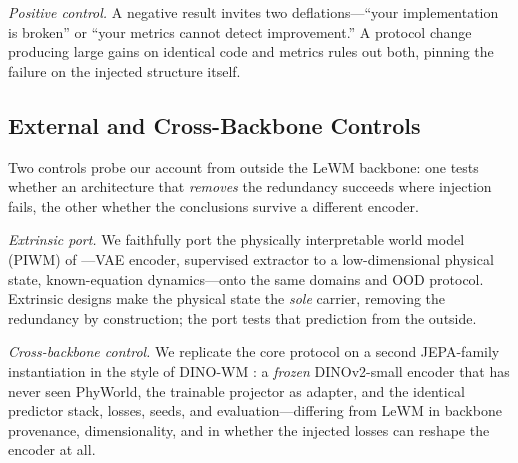 \emph{Positive control.} A negative result invites two deflations---``your implementation is broken'' or ``your metrics cannot detect improvement.'' A protocol change producing large gains on identical code and metrics rules out both, pinning the failure on the injected structure itself.

\subsection{External and Cross-Backbone Controls}
\label{sec:external}

Two controls probe our account from outside the LeWM backbone: one tests whether an architecture that \emph{removes} the redundancy succeeds where injection fails, the other whether the conclusions survive a different encoder.

\emph{Extrinsic port.} We faithfully port the physically interpretable world model (PIWM) of \citet{mao2024piwm}---VAE encoder, supervised extractor to a low-dimensional physical state, known-equation dynamics---onto the same domains and OOD protocol. Extrinsic designs make the physical state the \emph{sole} carrier, removing the redundancy by construction; the port tests that prediction from the outside.

\emph{Cross-backbone control.} We replicate the core protocol on a second JEPA-family instantiation in the style of DINO-WM \citep{zhou2025dinowm}: a \emph{frozen} DINOv2-small encoder \citep{oquab2024dinov2} that has never seen PhyWorld, the trainable projector as adapter, and the identical predictor stack, losses, seeds, and evaluation---differing from LeWM in backbone provenance, dimensionality, and in whether the injected losses can reshape the encoder at all.
